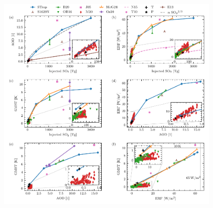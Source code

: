 \documentclass[draft]{agujournal2019}
\providecommand{\DIFaddbeginFL}{} %
\providecommand{\DIFaddendFL}{} %
\providecommand{\DIFdelbeginFL}{} %
\providecommand{\DIFdelendFL}{} %
\begin{document}
  \begin{figure}
    \centering \DIFdelbeginFL %
\DIFdelendFL \DIFaddbeginFL \includegraphics[width=1\linewidth]{figure4}
\DIFaddendFL 


\end{figure}
\end{document}
